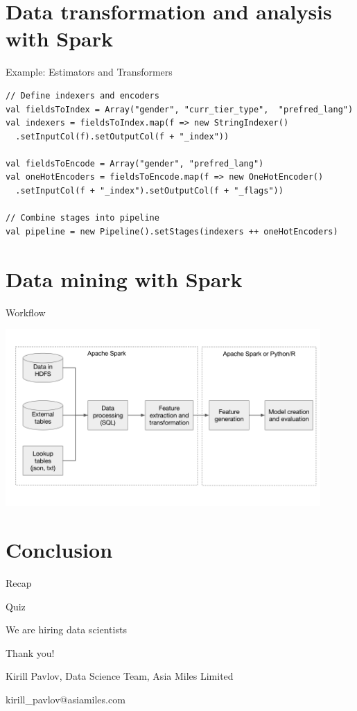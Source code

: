 \documentclass[unicode, notheorems]{beamer}
\begin{document}
\section{Data transformation and analysis with Spark}

\begin{frame}[fragile]{Example: Estimators and Transformers}

{\footnotesize
\begin{verbatim}
// Define indexers and encoders
val fieldsToIndex = Array("gender", "curr_tier_type",  "prefred_lang")
val indexers = fieldsToIndex.map(f => new StringIndexer()
  .setInputCol(f).setOutputCol(f + "_index"))

val fieldsToEncode = Array("gender", "prefred_lang")
val oneHotEncoders = fieldsToEncode.map(f => new OneHotEncoder()
  .setInputCol(f + "_index").setOutputCol(f + "_flags")) 

// Combine stages into pipeline
val pipeline = new Pipeline().setStages(indexers ++ oneHotEncoders) 
\end{verbatim}
}
\end{frame}

\section{Data mining with Spark}

\begin{frame}{Workflow}
\begin{center}
\includegraphics[width=12cm]{images/ml-workflow}
\end{center}
\end{frame}


\section{Conclusion}
\begin{frame}{Recap}
\end{frame}

\begin{frame}{Quiz}
\end{frame}

\begin{frame}{We are hiring data scientists}
\end{frame}

\begin{frame}
\begin{center}
{\huge Thank you!}

\vfill

Kirill Pavlov, Data Science Team, Asia Miles Limited

kirill\_pavlov@asiamiles.com
\end{center}
\end{frame}
\end{document}
